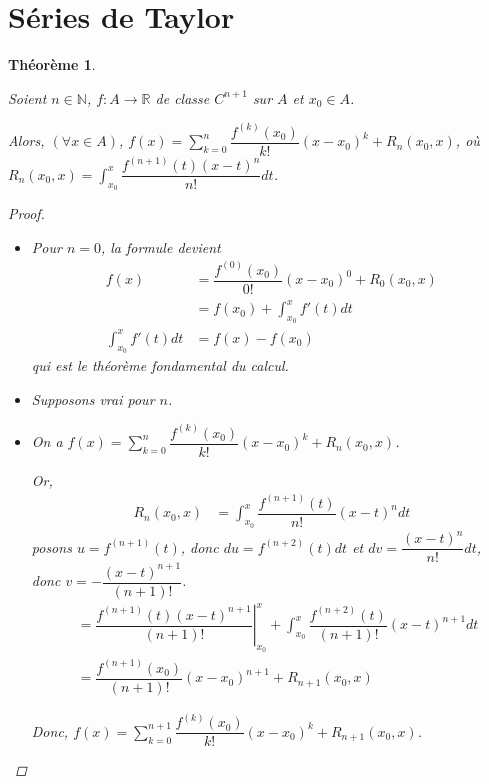 \documentclass{report}
\newcommand*{\dsum}[4]{\displaystyle\sum_{#1=#2}^{#3}#4}
\newcommand*{\dint}[3]{\displaystyle\int_{#1}^{#2}#3}
\newcommand*{\reels}{\mathbb{R}}
\newcommand*{\naturels}{\mathbb{N}}
\newtheorem*{thm}{Th\'eor\`eme}
\theoremstyle{definition}
\theoremstyle{remark}
\begin{document}
	\section{S\'eries de Taylor}
	\begin{thm}~

		Soient $n \in \naturels$, $f:A \to \reels$ de classe $C^{n+1}$ sur $A$ et $x_0 \in A$.

		Alors, $(\forall x \in A)$, $f(x) = \dsum{k}{0}{n}{\dfrac{f^{(k)}(x_0)}{k!}(x-x_0)^k} + R_n(x_0, x)$, o\`u $R_n(x_0, x) = \dint{x_0}{x}{\dfrac{f^{(n+1)}(t)(x-t)^n}{n!} dt}$.
		\begin{proof}~

			\begin{itemize}
				\item[Base:] Pour $n=0$, la formule devient
				\begin{align*}
					f(x)&= \dfrac{f^{(0)}(x_0)}{0!}(x-x_0)^0 + R_0(x_0, x)\\
					&= f(x_0) + \dint{x_0}{x}{f'(t) dt}\\
					\dint{x_0}{x}{f'(t) dt}&= f(x)-f(x_0)
				\end{align*}
				qui est le th\'eor\`eme fondamental du calcul.
				\item[Hyp:] Supposons vrai pour $n$.
				\item[Pas:] On a $f(x) = \dsum{k}{0}{n}{\dfrac{f^{(k)}(x_0)}{k!}(x-x_0)^k} + R_n(x_0, x)$.

				Or,
				\begin{align*}
					R_n(x_0, x)&= \dint{x_0}{x}{\dfrac{f^{(n+1)}(t)}{n!}(x-t)^n dt}
				\end{align*}
				posons $u = f^{(n+1)}(t)$, donc $du = f^{(n+2)}(t)dt$ et $dv = \dfrac{(x-t)^n}{n!}dt$, donc $v = -\dfrac{(x-t)^{n+1}}{(n+1)!}$.
				\begin{align*}
					&= \left. \dfrac{f^{(n+1)}(t)(x-t)^{n+1}}{(n+1)!} \right|_{x_0}^x + \dint{x_0}{x}{\dfrac{f^{(n+2)}(t)}{(n+1)!}(x-t)^{n+1} dt}\\
					&= \dfrac{f^{(n+1)}(x_0)}{(n+1)!}(x-x_0)^{n+1} + R_{n+1}(x_0, x)
				\end{align*}

				Donc, $f(x) = \dsum{k}{0}{n+1}{\dfrac{f^{(k)}(x_0)}{k!}(x-x_0)^k} + R_{n+1}(x_0, x)$.
			\end{itemize}
		\end{proof}
	\end{thm}
\end{document}
